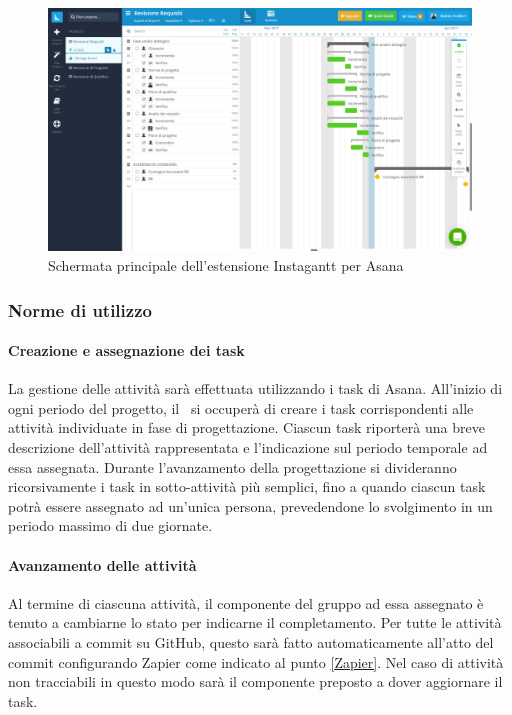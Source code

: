 \documentclass[../NormeDiProgetto.tex]{subfiles}
\begin{document}
				\begin{figure} [h!]
					\centering
					\includegraphics[scale=0.2]{./Immagini/Instagantt.png}
					\caption{Schermata principale dell'estensione Instagantt per Asana}\label{}
				\end{figure}
				\subsubsection{Norme di utilizzo}
				\paragraph{Creazione e assegnazione dei task\\}
					La gestione delle attività sarà effettuata utilizzando i task di Asana.
					All'inizio di ogni periodo del progetto, il \responsabilediprogetto\ si occuperà di creare i task corrispondenti alle attività individuate in fase di progettazione. Ciascun task riporterà una breve descrizione dell'attività rappresentata e l'indicazione sul periodo temporale ad essa assegnata. Durante l'avanzamento della progettazione si divideranno ricorsivamente i task in sotto-attività più semplici, fino a quando ciascun task potrà essere assegnato ad un'unica persona, prevedendone lo svolgimento in un periodo massimo di due giornate.
				\paragraph{Avanzamento delle attività\\}
					Al termine di ciascuna attività, il componente del gruppo ad essa assegnato è tenuto a cambiarne lo stato per indicarne il completamento. Per tutte le attività associabili a commit su GitHub, questo sarà fatto automaticamente all'atto del commit configurando Zapier come indicato al punto \ref{Zapier}. Nel caso di attività non tracciabili in questo modo sarà il componente preposto a dover aggiornare il task.
\end{document}
